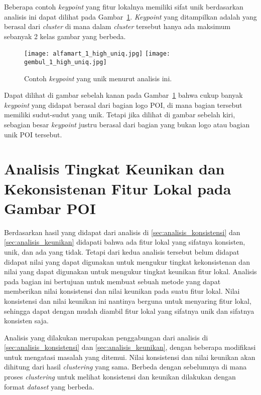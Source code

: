 Beberapa contoh \textit{keypoint} yang fitur lokalnya memiliki sifat unik berdasarkan analisis ini dapat dilihat pada Gambar~\ref{fig:keypoint_unik}. \textit{Keypoint} yang ditampilkan adalah yang berasal dari \textit{cluster} di mana dalam \textit{cluster} tersebut hanya ada maksimum sebanyak 2 kelas gambar yang berbeda.
\begin{figure}[H]
	\centering
	\texttt{[image: alfamart\_1\_high\_uniq.jpg]}
	\texttt{[image: gembul\_1\_high\_uniq.jpg]}
	\caption{Contoh \textit{keypoint} yang unik menurut analisis ini.}
	\label{fig:keypoint_unik}
\end{figure}

Dapat dilihat di gambar sebelah kanan pada Gambar~\ref{fig:keypoint_unik} bahwa cukup banyak \textit{keypoint} yang didapat berasal dari bagian logo POI, di mana bagian tersebut memiliki sudut-sudut yang unik. Tetapi jika dilihat di gambar sebelah kiri, sebagian besar \textit{keypoint} justru berasal dari bagian yang bukan logo atau bagian unik POI tersebut. 

\section{Analisis Tingkat Keunikan dan Kekonsistenan Fitur Lokal pada Gambar POI}
\label{sec:analisis_sifat}
Berdasarkan hasil yang didapat dari analisis di \ref{sec:analisis_konsistensi} dan \ref{sec:analisis_keunikan} didapati bahwa ada fitur lokal yang sifatnya konsisten, unik, dan ada yang tidak. Tetapi dari kedua analisis tersebut belum didapat didapat nilai yang dapat digunakan untuk mengukur tingkat kekonsistenan dan nilai yang dapat digunakan untuk mengukur tingkat keunikan fitur lokal. Analisis pada bagian ini bertujuan untuk membuat sebuah metode yang dapat memberikan nilai konsistensi dan nilai keunikan pada suatu fitur lokal. Nilai konsistensi dan nilai keunikan ini nantinya berguna untuk menyaring fitur lokal, sehingga dapat dengan mudah diambil fitur lokal yang sifatnya unik dan sifatnya konsisten saja.

Analisis yang dilakukan merupakan penggabungan dari analisis di \ref{sec:analisis_konsistensi} dan \ref{sec:analisis_keunikan},  dengan beberapa modifikasi untuk mengatasi masalah yang ditemui. Nilai konsistensi dan nilai keunikan akan dihitung dari hasil \textit{clustering} yang sama. Berbeda dengan sebelumnya di mana proses \textit{clustering} untuk melihat konsistensi dan keunikan dilakukan dengan format \textit{dataset} yang berbeda. 

